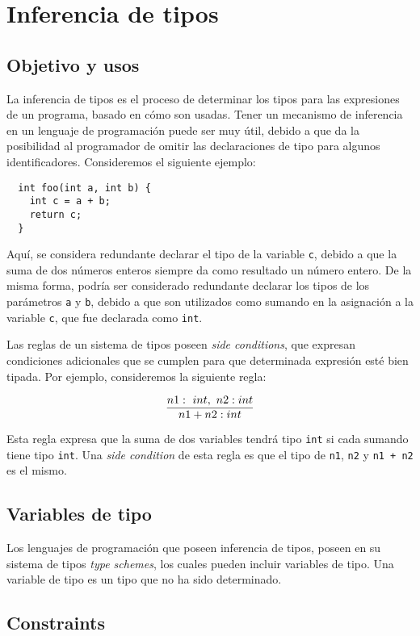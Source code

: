 \section{Inferencia de tipos}
\subsection{Objetivo y usos}
La inferencia de tipos es el proceso de determinar los tipos para las expresiones de un programa, basado en cómo son usadas. Tener un mecanismo de inferencia en un lenguaje de programación puede ser muy útil, debido a que da la posibilidad al programador de omitir las declaraciones de tipo para algunos identificadores. Consideremos el siguiente ejemplo:

\begin{lstlisting}
  int foo(int a, int b) {
    int c = a + b;
    return c;
  }
\end{lstlisting}

Aquí, se considera redundante declarar el tipo de la variable \texttt{c}, debido a que la suma de dos números enteros siempre da como resultado un número entero. De la misma forma, podría ser considerado redundante declarar los tipos de los parámetros \texttt{a} y \texttt{b}, debido a que son utilizados como sumando en la asignación a la variable \texttt{c}, que fue declarada como \texttt{int}.

Las reglas de un sistema de tipos poseen \textit{side conditions}, que expresan condiciones adicionales que se cumplen para que determinada expresión esté bien tipada. Por ejemplo, consideremos la siguiente regla:

\begin{center}
      \[\infer{n1+n2 : int}{n1: \ int,\ n2: int}\]
    \end{center}

Esta regla expresa que la suma de dos variables tendrá tipo \texttt{int} si cada sumando tiene tipo \texttt{int}. Una \textit{side condition} de esta regla es que el tipo de \texttt{n1}, \texttt{n2} y \texttt{n1 + n2} es el mismo.
\subsection{Variables de tipo}
Los lenguajes de programación que poseen inferencia de tipos, poseen en su sistema de tipos \textit{type schemes}, los cuales pueden incluir variables de tipo. Una variable de tipo es un tipo que no ha sido determinado.
\subsection{Constraints}
